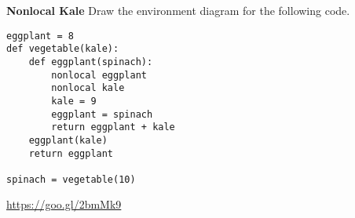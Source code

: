 \begin{blocksection}
\question \textbf{Nonlocal Kale} \newline
Draw the environment diagram for the following code.

\begin{lstlisting}
eggplant = 8
def vegetable(kale):
    def eggplant(spinach):
        nonlocal eggplant
        nonlocal kale
        kale = 9
        eggplant = spinach
        return eggplant + kale
    eggplant(kale)
    return eggplant

spinach = vegetable(10)
\end{lstlisting}

\begin{solution}[1.5in]
\url{https://goo.gl/2bmMk9}
\end{solution}
\end{blocksection}
